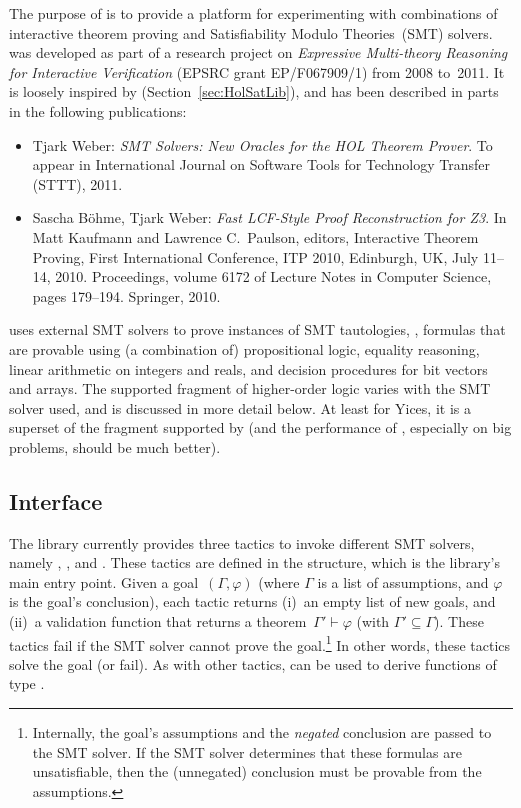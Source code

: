
\setcounter{sessioncount}{0}

The purpose of  is to provide a platform for
experimenting with combinations of interactive theorem proving and
Satisfiability Modulo Theories~(SMT) solvers.   was
developed as part of a research project on {\it Expressive
  Multi-theory Reasoning for Interactive Verification} (EPSRC grant
EP/F067909/1) from 2008 to~2011.  It is loosely inspired by
 (Section~\ref{sec:HolSatLib}), and has been described
in parts in the following publications:
\begin{itemize}
\item Tjark Weber: {\it SMT Solvers: New Oracles for the HOL Theorem
  Prover}.  To appear in International Journal on Software Tools for
  Technology Transfer (STTT), 2011.
\item Sascha B{\"o}hme, Tjark Weber: {\it Fast LCF-Style Proof
  Reconstruction for Z3}.  In Matt Kaufmann and Lawrence C.\ Paulson,
  editors, Interactive Theorem Proving, First International
  Conference, ITP 2010, Edinburgh, UK, July 11--14, 2010.
  Proceedings, volume 6172 of Lecture Notes in Computer Science, pages
  179--194.  Springer, 2010.
\end{itemize}
 uses external SMT solvers to prove instances of SMT
tautologies, \ie, formulas that are provable using (a combination of)
propositional logic, equality reasoning, linear arithmetic on integers
and reals, and decision procedures for bit vectors and arrays.  The
supported fragment of higher-order logic varies with the SMT solver
used, and is discussed in more detail below.  At least for Yices, it
is a superset of the fragment supported by  (and
the performance of , especially on big problems, should
be much better).

\subsection{Interface}

The library currently provides three tactics to invoke different SMT
solvers, namely , , and
.  These tactics are defined in the 
structure, which is the library's main entry point.  Given a
goal~$(\Gamma, \varphi)$ (where $\Gamma$ is a list of assumptions, and
$\varphi$ is the goal's conclusion), each tactic returns (i)~an empty
list of new goals, and (ii)~a validation function that returns a
theorem~$\Gamma' \vdash \varphi$ (with $\Gamma' \subseteq \Gamma$).
These tactics fail if the SMT solver cannot prove the
goal.\footnote{Internally, the goal's assumptions and the
  \emph{negated} conclusion are passed to the SMT solver.  If the SMT
  solver determines that these formulas are unsatisfiable, then the
  (unnegated) conclusion must be provable from the assumptions.}  In
other words, these tactics solve the goal (or fail).  As with other
tactics,  can be used to derive functions of
type .

